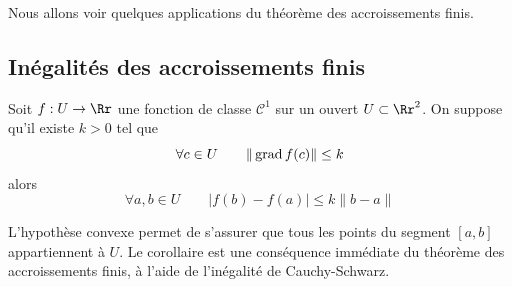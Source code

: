 \documentclass[12pt, class=report,crop=false]{standalone}
\begin{document}
\bigskip


Nous allons voir quelques applications du théorème des accroissements finis.


\subsection{Inégalités des accroissements finis}

\begin{corollaire}
Soit $f: U \to \Rr$ une fonction de classe $\mathcal{C}^1$ sur un ouvert  $U \subset \Rr^2$. 
On suppose qu'il existe $k>0$ tel que
$$\forall c \in U \qquad \| \operatorname{grad} f (c) \| \le k$$
alors
$$\forall a,b \in U \qquad  \left| f(b)-f(a)  \right| \le k   \| b -a \|$$
\end{corollaire}
L'hypothèse convexe permet de s'assurer que tous les points du segment $[a,b]$ appartiennent à $U$. Le corollaire est une conséquence immédiate du théorème des accroissements finis, à l'aide de l'inégalité de Cauchy-Schwarz.
\end{document}

